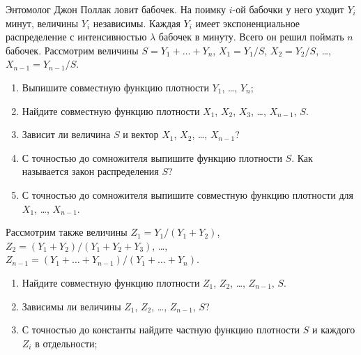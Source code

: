 \begin{problem}
    Энтомолог Джон Поллак ловит бабочек. На поимку $i$-ой бабочки у него уходит $Y_i$ минут, величины $Y_i$ независимы. Каждая $Y_i$ имеет экспоненциальное распределение с интенсивностью $\lambda$ бабочек в минуту. Всего он решил поймать $n$ бабочек. Рассмотрим величины $S=Y_1 + \ldots + Y_n$, $X_1 = Y_1 / S$, $X_2 = Y_2/S$, \ldots, $X_{n-1}=Y_{n-1}/S$.

\begin{enumerate}
    \item Выпишите совместную функцию плотности $Y_1$, \ldots, $Y_n$;
    \item Найдите совместную функцию плотности $X_1$, $X_2$, $X_3$, \ldots, $X_{n-1}$, $S$.
    \item Зависит ли величина $S$ и вектор $X_1$, $X_2$, \ldots, $X_{n-1}$?
    \item С точностью до сомножителя выпишите функцию плотности $S$. Как называется закон распределения $S$?
    \item С точностью до сомножителя выпишите совместную функцию плотности для $X_1$, \ldots, $X_{n-1}$.
\end{enumerate}

Рассмотрим также величины $Z_1 = Y_1 / (Y_1 + Y_2)$, $Z_2 = (Y_1 + Y_2) / (Y_1 + Y_2 + Y_3)$, \ldots, $Z_{n-1} = (Y_1 + \ldots + Y_{n-1}) / (Y_1 + \ldots + Y_n)$.

\begin{enumerate}[resume]
    \item Найдите совместную функцию плотности $Z_1$, $Z_2$, \ldots, $Z_{n-1}$, $S$.
    \item Зависимы ли величины $Z_1$, $Z_2$, \ldots, $Z_{n-1}$, $S$?
    \item С точностью до константы найдите частную функцию плотности $S$ и каждого $Z_i$ в отдельности;
\end{enumerate}


\begin{sol}
\end{sol}
\end{problem}






